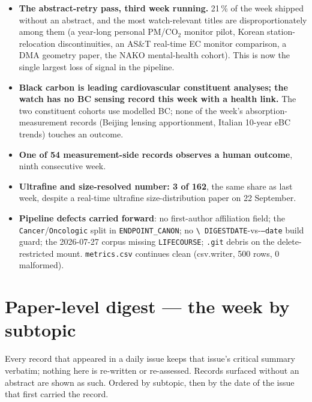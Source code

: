 \documentclass[10pt]{article}
\begin{document}
\footnotesize
\begin{itemize}
\item \textbf{The abstract-retry pass, third week running.} 21\,\% of the week shipped without an
abstract, and the most watch-relevant titles are disproportionately among them (a year-long
personal PM/CO$_2$ monitor pilot, Korean station-relocation discontinuities, an AS\&T real-time EC
monitor comparison, a DMA geometry paper, the NAKO mental-health cohort). This is now the single
largest loss of signal in the pipeline.

\item \textbf{Black carbon is leading cardiovascular constituent analyses; the watch has no BC
sensing record this week with a health link.} The two constituent cohorts use modelled BC; none of
the week's absorption-measurement records (Beijing lensing apportionment, Italian 10-year eBC
trends) touches an outcome.

\item \textbf{One of 54 measurement-side records observes a human outcome}, ninth consecutive
week.

\item \textbf{Ultrafine and size-resolved number: 3 of 162}, the same share as last week, despite
a real-time ultrafine size-distribution paper on 22 September.

\item \textbf{Pipeline defects carried forward}: no first-author affiliation field; the
\texttt{Cancer}/\texttt{Oncologic} split in \texttt{ENDPOINT\_CANON}; no \texttt{\textbackslash
DIGESTDATE}-vs-\texttt{--date} build guard; the 2026-07-27 corpus missing \texttt{LIFECOURSE};
\texttt{.git} debris on the delete-restricted mount. \texttt{metrics.csv} continues clean (csv.writer,
500 rows, 0 malformed).
\end{itemize}

\clearpage

\section*{\sffamily\bfseries\color{Deep}Paper-level digest --- the week by subtopic}
\vspace{-1.5mm}{\color{Teal}\rule{\linewidth}{1.1pt}}\vspace{1mm}

{\fontsize{7.4}{9}\selectfont\color{Slate}Every record that appeared in a daily issue
keeps that issue's critical summary verbatim; nothing here is re-written or re-assessed.
Records surfaced without an abstract are shown as such. Ordered by subtopic, then by the
date of the issue that first carried the record.\par}
\end{document}
